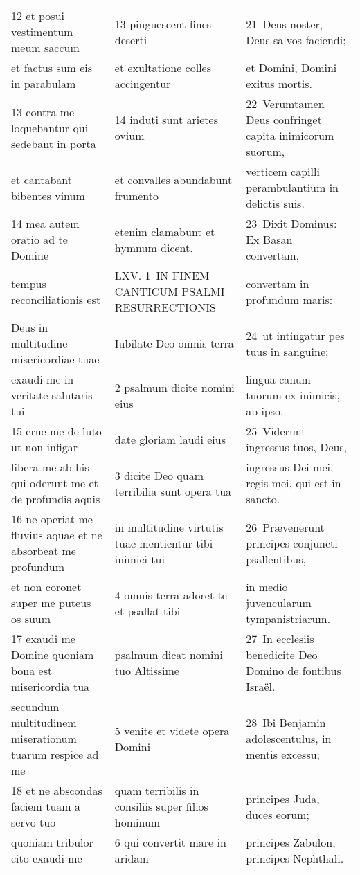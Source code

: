 \documentclass{article}
\begin{document}
\begin{longtable}{@{}p{}p{}p{}@{}}
12 et posui vestimentum meum saccum	&	13 pinguescent fines deserti	&	21 Deus noster, Deus salvos faciendi;	\\
et factus sum eis in parabulam	&	et exultatione colles accingentur	&	et Domini, Domini exitus mortis.	\\
13 contra me loquebantur qui sedebant in porta	&	14 induti sunt arietes ovium	&	22 Verumtamen Deus confringet capita inimicorum suorum,	\\
et cantabant bibentes vinum	&	et convalles abundabunt frumento	&	verticem capilli perambulantium in delictis suis.	\\
14 mea autem oratio ad te Domine	&	etenim clamabunt et hymnum dicent.	&	23 Dixit Dominus: Ex Basan convertam,	\\
tempus reconciliationis est	&	LXV. 1 IN FINEM CANTICUM PSALMI RESURRECTIONIS	&	convertam in profundum maris:	\\
Deus in multitudine misericordiae tuae	&	Iubilate Deo omnis terra	&	24 ut intingatur pes tuus in sanguine;	\\
exaudi me in veritate salutaris tui	&	2 psalmum dicite nomini eius	&	lingua canum tuorum ex inimicis, ab ipso.	\\
15 erue me de luto ut non infigar	&	date gloriam laudi eius	&	25 Viderunt ingressus tuos, Deus,	\\
libera me ab his qui oderunt me et de profundis aquis	&	3 dicite Deo quam terribilia sunt opera tua	&	ingressus Dei mei, regis mei, qui est in sancto.	\\
16 ne operiat me fluvius aquae et ne absorbeat me profundum	&	in multitudine virtutis tuae mentientur tibi inimici tui	&	26 Prævenerunt principes conjuncti psallentibus,	\\
et non coronet super me puteus os suum	&	4 omnis terra adoret te et psallat tibi	&	in medio juvencularum tympanistriarum.	\\
17 exaudi me Domine quoniam bona est misericordia tua	&	psalmum dicat nomini tuo Altissime	&	27 In ecclesiis benedicite Deo Domino de fontibus Israël.	\\
secundum multitudinem miserationum tuarum respice ad me	&	5 venite et videte opera Domini	&	28 Ibi Benjamin adolescentulus, in mentis excessu;	\\
18 et ne abscondas faciem tuam a servo tuo	&	quam terribilis in consiliis super filios hominum	&	principes Juda, duces eorum;	\\
quoniam tribulor cito exaudi me	&	6 qui convertit mare in aridam	&	principes Zabulon, principes Nephthali.	\\

\end{longtable}
\end{document}
